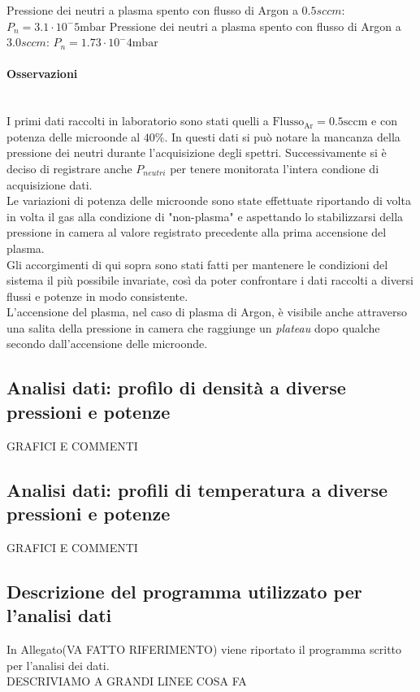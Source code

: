 Pressione dei neutri a plasma spento con flusso di Argon a $0.5sccm$: $P_n=3.1\cdot10^-5\si{\milli\bar}$
Pressione dei neutri a plasma spento con flusso di Argon a $3.0sccm$: $P_n=1.73\cdot10^-4\si{\milli\bar}$

\paragraph{Osservazioni} ~\\
I primi dati raccolti in laboratorio sono stati quelli a $\text{Flusso}_\text{Ar}=0.5\text{sccm}$ e con potenza delle microonde al $40\%$. In questi dati si può notare la mancanza della pressione dei neutri durante l'acquisizione degli spettri. Successivamente si è deciso di registrare anche $P_{neutri}$ per tenere monitorata l'intera condione di acquisizione dati.\\
Le variazioni di potenza delle microonde sono state effettuate riportando di volta in volta il gas alla condizione di "non-plasma" e aspettando lo stabilizzarsi della pressione in camera al valore registrato precedente alla prima accensione del plasma.\\
Gli accorgimenti di qui sopra sono stati fatti per mantenere le condizioni del sistema il più possibile invariate, così da poter confrontare i dati raccolti a diversi flussi e potenze in modo consistente.\\
L'accensione del plasma, nel caso di plasma di Argon, è visibile anche attraverso una salita della pressione in camera che raggiunge un \textit{plateau} dopo qualche secondo dall'accensione delle microonde.

\subsection{Analisi dati: profilo di densità a diverse pressioni e potenze}

GRAFICI E COMMENTI
\subsection{Analisi dati: profili di temperatura a diverse pressioni e potenze}

GRAFICI E COMMENTI

\subsection{Descrizione del programma utilizzato per l'analisi dati}
In Allegato(VA FATTO RIFERIMENTO) viene riportato il programma scritto per l'analisi dei dati.\\
DESCRIVIAMO A GRANDI LINEE COSA FA



